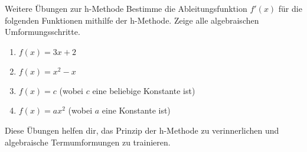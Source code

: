 \begin{aufgabenumgebung}{Weitere Übungen zur h-Methode}
Bestimme die Ableitungsfunktion $f'(x)$ für die folgenden Funktionen mithilfe der h-Methode. Zeige alle algebraischen Umformungsschritte.
\begin{enumerate}
    \item $f(x) = 3x + 2$ 
    \item $f(x) = x^2 - x$
    \item $f(x) = c$ (wobei $c$ eine beliebige Konstante ist)
    \item $f(x) = ax^2$ (wobei $a$ eine Konstante ist)
\end{enumerate}
Diese Übungen helfen dir, das Prinzip der h-Methode zu verinnerlichen und algebraische Termumformungen zu trainieren.
\end{aufgabenumgebung}


